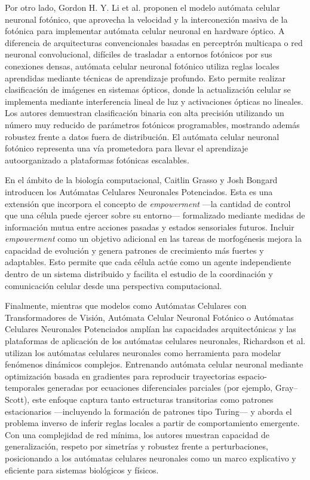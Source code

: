 Por otro lado, Gordon H. Y. Li et al. \cite{PNCA} proponen el modelo autómata celular neuronal fotónico, que aprovecha la velocidad y la interconexión masiva de la fotónica para implementar autómata celular neuronal en hardware óptico. A diferencia de arquitecturas convencionales basadas en perceptrón multicapa o red neuronal convolucional, difíciles de trasladar a entornos fotónicos por sus conexiones densas, autómata celular neuronal fotónico utiliza reglas locales aprendidas mediante técnicas de aprendizaje profundo. Esto permite realizar clasificación de imágenes en sistemas ópticos, donde la actualización celular se implementa mediante interferencia lineal de luz y activaciones ópticas no lineales. Los autores demuestran clasificación binaria con alta precisión utilizando un número muy reducido de parámetros fotónicos programables, mostrando además robustez frente a datos fuera de distribución. El autómata celular neuronal fotónico representa una vía prometedora para llevar el aprendizaje autoorganizado a plataformas fotónicas escalables.

En el ámbito de la biología computacional, Caitlin Grasso y Josh Bongard \cite{ENCA} introducen los Autómatas Celulares Neuronales Potenciados. Esta es una extensión que incorpora el concepto de \textit{empowerment} —la cantidad de control que una célula puede ejercer sobre su entorno— formalizado mediante medidas de información mutua entre acciones pasadas y estados sensoriales futuros. Incluir \textit{empowerment} como un objetivo adicional en las tareas de morfogénesis mejora la capacidad de evolución y genera patrones de crecimiento más fuertes y adaptables. Esto permite que cada célula actúe como un agente independiente dentro de un sistema distribuido y facilita el estudio de la coordinación y comunicación celular desde una perspectiva computacional.

Finalmente, mientras que modelos como Autómatas Celulares con Transformadores de Visión, Autómata Celular Neuronal Fotónico o Autómatas Celulares Neuronales Potenciados amplían las capacidades arquitectónicas y las plataformas de aplicación de los autómatas celulares neuronales, Richardson et al. \cite{richardsonNCA} utilizan los autómatas celulares neuronales como herramienta para modelar fenómenos dinámicos complejos. Entrenando autómata celular neuronal mediante optimización basada en gradientes para reproducir trayectorias espacio-temporales generadas por ecuaciones diferenciales parciales (por ejemplo, Gray–Scott), este enfoque captura tanto estructuras transitorias como patrones estacionarios —incluyendo la formación de patrones tipo Turing— y aborda el problema inverso de inferir reglas locales a partir de comportamiento emergente. Con una complejidad de red mínima, los autores muestran capacidad de generalización, respeto por simetrías y robustez frente a perturbaciones, posicionando a los autómatas celulares neuronales como un marco explicativo y eficiente para sistemas biológicos y físicos.

